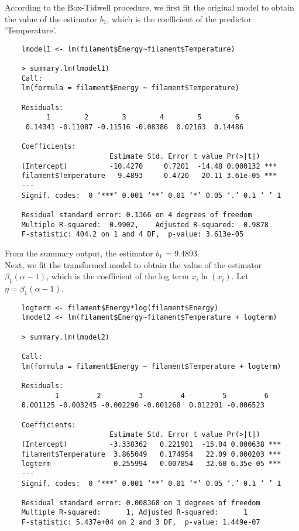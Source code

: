 \documentclass{exam}
\begin{document}
\begin{questions}
    According to the Box-Tidwell procedure, we first fit the original model to obtain the value of the estimator $b_1$, which is the coefficient of the predictor 'Temperature'.
    \begin{verbatim}
    lmodel1 <- lm(filament$Energy~filament$Temperature)
    
    > summary.lm(lmodel1)
    Call:
    lm(formula = filament$Energy ~ filament$Temperature)

    Residuals:
          1        2        3        4        5        6 
     0.14341 -0.11087 -0.11516 -0.08386  0.02163  0.14486 

    Coefficients:
                         Estimate Std. Error t value Pr(>|t|)    
    (Intercept)          -10.4270     0.7201  -14.48 0.000132 ***
    filament$Temperature   9.4893     0.4720   20.11 3.61e-05 ***
    ---
    Signif. codes:  0 ‘***’ 0.001 ‘**’ 0.01 ‘*’ 0.05 ‘.’ 0.1 ‘ ’ 1

    Residual standard error: 0.1366 on 4 degrees of freedom
    Multiple R-squared:  0.9902,	Adjusted R-squared:  0.9878 
    F-statistic: 404.2 on 1 and 4 DF,  p-value: 3.613e-05
    \end{verbatim}
    
    From the summary output, the estimator $b_1$ = 9.4893.\\

    Next, we fit the transformed model to obtain the value of the estimator $\beta_1(\alpha - 1)$, which is the coefficient of the log term $x_i\ln(x_i)$. Let $\eta = \beta_1(\alpha - 1)$.
    \begin{verbatim}
    logterm <- filament$Energy*log(filament$Energy)
    lmodel2 <- lm(filament$Energy~filament$Temperature + logterm)

    > summary.lm(lmodel2)
    
    Call:
    lm(formula = filament$Energy ~ filament$Temperature + logterm)

    Residuals:
            1         2         3         4         5         6 
    0.001125 -0.003245 -0.002290 -0.001268  0.012201 -0.006523 

    Coefficients:
                         Estimate Std. Error t value Pr(>|t|)    
    (Intercept)          -3.338362   0.221901  -15.04 0.000638 ***
    filament$Temperature  3.865049   0.174954   22.09 0.000203 ***
    logterm               0.255994   0.007854   32.60 6.35e-05 ***
    ---
    Signif. codes:  0 ‘***’ 0.001 ‘**’ 0.01 ‘*’ 0.05 ‘.’ 0.1 ‘ ’ 1

    Residual standard error: 0.008368 on 3 degrees of freedom
    Multiple R-squared:      1,	Adjusted R-squared:      1 
    F-statistic: 5.437e+04 on 2 and 3 DF,  p-value: 1.449e-07
    \end{verbatim}
    

\end{questions}
\end{document}
